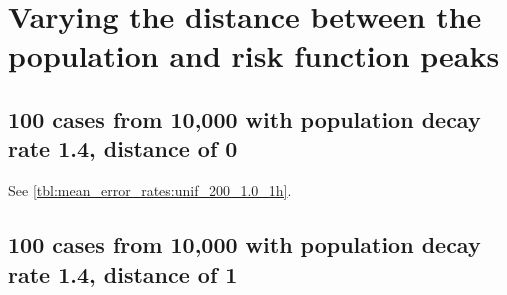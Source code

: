 \section{Varying the distance between the population and risk function peaks}

\subsection{100 cases from 10,000 with population decay rate 1.4, distance of 0}

See \autoref{tbl:mean_error_rates:unif_200_1.0_1h}.

\begin{table}[H]
\centering
\scriptsize

    \begin{subtable}{0.5\textwidth}
    
    \caption[]{Means} 
    \end{subtable}%
    \begin{subtable}{0.5\textwidth}
    
    \caption[]{Standard deviations} 
    \end{subtable}

\caption[]{Error rates for uniform population of 10,000, single peak intensity of factor 100 and decay rate 1.4, distance between population peak and risk peak is 0}
\label{tbl:mean_error_rates:p1.4_100_1.0_1h:2}
\end{table}

\subsection{100 cases from 10,000 with population decay rate 1.4, distance of 1}
\begin{table}[H]
\centering
\scriptsize

    \begin{subtable}{0.5\textwidth}
    
    \caption[]{Means} 
    \end{subtable}%
    \begin{subtable}{0.5\textwidth}
    
    \caption[]{Standard deviations} 
    \end{subtable}

\caption[]{Error rates for uniform population of 10,000, single peak intensity of factor 100 and decay rate 1.4, distance between population peak and risk peak is 1}
\label{tbl:mean_error_rates:p1.4_100_1.0_1h_1s}
\end{table}

